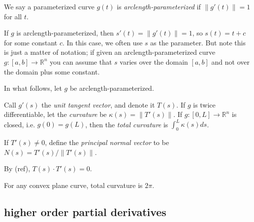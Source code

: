 \documentclass[12pt]{article}
\begin{document}
\begin{definition}
	We say a parameterized curve $g(t)$ is \emph{arclength-parameterized} if $\|g'(t)\|=1$ for all $t$.
\end{definition}

\begin{remark}
	If $g$ is arclength-parameterized, then $s'(t)=\|g'(t)\|=1$, so $s(t)=t+c$ for some constant $c$. In this case, we often use $s$ as the parameter. But note this is just a matter of notation; if given an arclength-parameterized curve $g:[a,b]\to\mathbb{R}^n$ you can assume that $s$ varies over the domain $[a,b]$ and not over the domain plus some constant.
\end{remark}

In what follows, let $g$ be arclength-parameterized.

\begin{definition}
	Call $g'(s)$ the \emph{unit tangent vector}, and denote it $T(s)$. If $g$ is twice differentiable, let the \emph{curvature} be $\kappa(s)=\|T'(s)\|$. If $g:[0,L]\to\mathbb{R}^n$ is closed, i.e. $g(0)=g(L)$, then the \emph{total curvature} is $\int_0^L \kappa(s)ds$.

	If $T'(s)\neq 0$, define the \emph{principal normal vector} to be $N(s)=T'(s)/\|T'(s)\|$.
\end{definition}

\begin{remark}
	By (ref), $T(s)\cdot T'(s)=0$.
\end{remark}

\begin{proposition}
	For any convex plane curve, total curvature is $2\pi$.
\end{proposition}


\subsection{higher order partial derivatives} %
\end{document}
